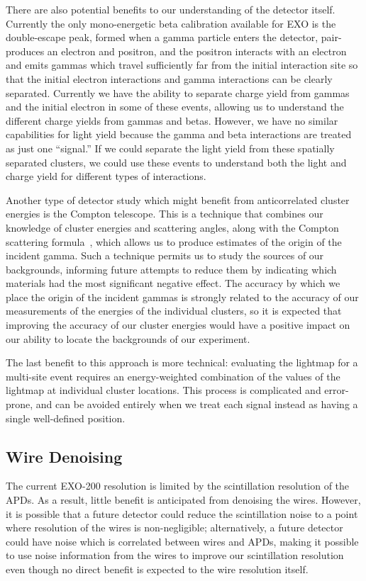 There are also potential benefits to our understanding of the detector itself.  Currently the only mono-energetic beta calibration available for EXO is the double-escape peak, formed when a gamma particle enters the detector, pair-produces an electron and positron, and the positron interacts with an electron and emits gammas which travel sufficiently far from the initial interaction site so that the initial electron interactions and gamma interactions can be clearly separated.  Currently we have the ability to separate charge yield from gammas and the initial electron in some of these events, allowing us to understand the different charge yields from gammas and betas.  However, we have no similar capabilities for light yield because the gamma and beta interactions are treated as just one ``signal.''  If we could separate the light yield from these spatially separated clusters, we could use these events to understand both the light and charge yield for different types of interactions.

Another type of detector study which might benefit from anticorrelated cluster energies is the Compton telescope.  This is a technique that combines our knowledge of cluster energies and scattering angles, along with the Compton scattering formula~\cite{ComptonScattering}, which allows us to produce estimates of the origin of the incident gamma.  Such a technique permits us to study the sources of our backgrounds, informing future attempts to reduce them by indicating which materials had the most significant negative effect.  The accuracy by which we place the origin of the incident gammas is strongly related to the accuracy of our measurements of the energies of the individual clusters, so it is expected that improving the accuracy of our cluster energies would have a positive impact on our ability to locate the backgrounds of our experiment.

The last benefit to this approach is more technical: evaluating the lightmap for a multi-site event requires an energy-weighted combination of the values of the lightmap at individual cluster locations.  This process is complicated and error-prone, and can be avoided entirely when we treat each signal instead as having a single well-defined position.

\subsection{Wire Denoising}

The current EXO-200 resolution is limited by the scintillation resolution of the APDs.  As a result, little benefit is anticipated from denoising the wires.  However, it is possible that a future detector could reduce the scintillation noise to a point where resolution of the wires is non-negligible; alternatively, a future detector could have noise which is correlated between wires and APDs, making it possible to use noise information from the wires to improve our scintillation resolution even though no direct benefit is expected to the wire resolution itself.

